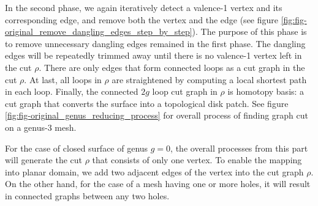 \documentclass[a4paper,twoside]{article}
\begin{document}
In the second phase, we again iteratively detect a valence-1 vertex and its corresponding edge, and remove both the vertex and the edge (see figure \ref{fig:fig-original_remove_dangling_edges_step_by_step}). The purpose of this phase is to remove unnecessary dangling edges remained in the first phase. The dangling edges will be repeatedly trimmed away until there is no valence-1 vertex left in the cut $\rho$. There are only edges that form connected loops as a cut graph in the cut $\rho$. At last, all loops in $\rho$ are straightened by computing a local shortest path in each loop. Finally, the connected $2g$ loop cut graph in $\rho$ is homotopy basis: a cut graph that converts the surface into a topological disk patch. See figure \ref{fig:fig-original_genus_reducing_process} for overall process of finding graph cut on a genus-3 mesh.

For the case of closed surface of genus $g=0$, the overall processes from this part will generate the cut $\rho$ that consists of only one vertex. To enable the mapping into planar domain, we add two adjacent edges of the vertex into the cut graph $\rho$. On the other hand, for the case of a mesh having one or more holes, it will result in connected graphs between any two holes.
\end{document}
